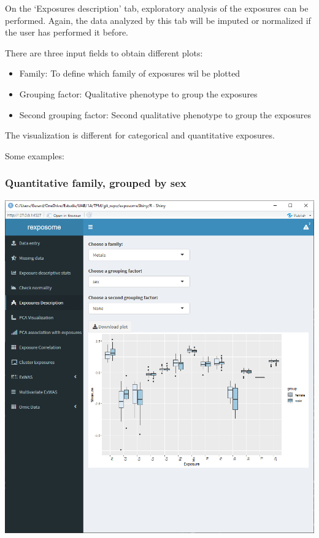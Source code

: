 \documentclass[
]{book}
\providecommand{\tightlist}{%
  \setlength{\itemsep}{0pt}\setlength{\parskip}{0pt}}
\begin{document}
On the `Exposures description' tab, exploratory analysis of the exposures can be performed. Again, the data analyzed by this tab will be imputed or normalized if the user has performed it before.

There are three input fields to obtain different plots:

\begin{itemize}
\tightlist
\item
  Family: To define which family of exposures wil be plotted
\item
  Grouping factor: Qualitative phenotype to group the exposures
\item
  Second grouping factor: Second qualitative phenotype to group the exposures
\end{itemize}

The visualization is different for categorical and quantitative exposures.

Some examples:

\hypertarget{quantitative-family-grouped-by-sex}{%
\subsubsection{Quantitative family, grouped by sex}\label{quantitative-family-grouped-by-sex}}

\includegraphics{images/analysis4_2.png}
\end{document}
